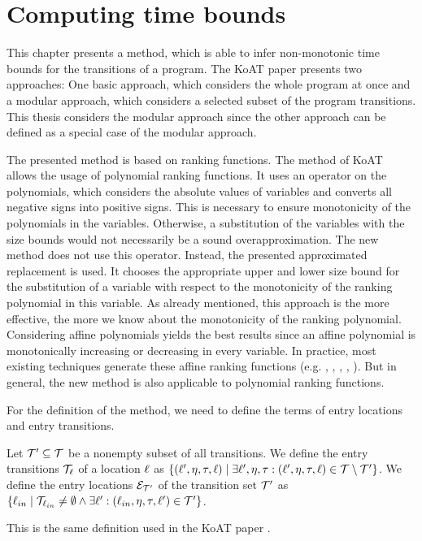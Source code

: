 \section{Computing time bounds}

This chapter presents a method, which is able to infer non-monotonic time bounds for the transitions of a program.
The KoAT paper \cite{koat} presents two approaches: One basic approach, which considers the whole program at once and a modular approach, which considers a selected subset of the program transitions.
This thesis considers the modular approach since the other approach can be defined as a special case of the modular approach.

The presented method is based on ranking functions.
The method of KoAT \cite{koat} allows the usage of polynomial ranking functions.
It uses an operator on the polynomials, which considers the absolute values of variables and converts all negative signs into positive signs.
This is necessary to ensure monotonicity of the polynomials in the variables.
Otherwise, a substitution of the variables with the size bounds would not necessarily be a sound overapproximation.
The new method does not use this operator.
Instead, the presented approximated replacement is used.
It chooses the appropriate upper and lower size bound for the substitution of a variable with respect to the monotonicity of the ranking polynomial in this variable.
As already mentioned, this approach is the more effective, the more we know about the monotonicity of the ranking polynomial.
Considering affine polynomials yields the best results since an affine polynomial is monotonically increasing or decreasing in every variable.
In practice, most existing techniques generate these affine ranking functions (e.g. \cite{podelski2004prf}, \cite{bradley2005linear}, \cite{bagnara2012new}, \cite{leike2014ranking}, \cite{ben2013linear}).
But in general, the new method is also applicable to polynomial ranking functions.

For the definition of the method, we need to define the terms of entry locations and entry transitions.
\begin{definition}
  Let $\mathcal{T}' \subseteq \mathcal{T}$ be a nonempty subset of all transitions.
  We define the entry transitions $\mathcal{T}_{\ell}$ of a location $\ell$ as $\lbrace (\ell', \eta, \tau, \ell) \mid \exists \ell', \eta, \tau: (\ell', \eta, \tau, \ell) \in \mathcal{T} \setminus \mathcal{T}' \rbrace$.
  We define the entry locations $\mathcal{E}_{\mathcal{T}'}$ of the transition set $\mathcal{T}'$ as $\lbrace \ell_{in} \mid \mathcal{T}_{\ell_{in}} \neq \emptyset \wedge \exists \ell': (\ell_{in}, \eta, \tau, \ell') \in \mathcal{T}' \rbrace$.
\end{definition}
This is the same definition used in the KoAT paper \cite{koat}.

